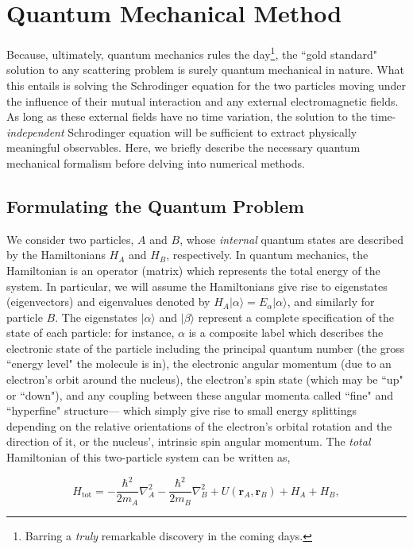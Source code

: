 \documentclass[%
 reprint,
 amsmath,amssymb,
 aps,
 nofootinbib
]{revtex4-1}
\begin{document}
\section{\label{sec:QuantumTraj}Quantum Mechanical Method}
Because, ultimately, quantum mechanics rules the day\footnote{Barring a \textit{truly} remarkable discovery in the coming days.}, the ``gold standard" solution to any scattering problem is surely quantum mechanical in nature. What this entails is solving the Schrodinger equation for the two particles moving under the influence of their mutual interaction and any external electromagnetic fields. As long as these external fields have no time variation, the solution to the time-\textit{independent} Schrodinger equation will be sufficient to extract physically meaningful observables. Here, we briefly describe the necessary quantum mechanical formalism before delving into numerical methods.

\subsection{\label{sec:QuantumFormalism} Formulating the Quantum Problem}
We consider two particles, $A$ and $B$, whose \textit{internal} quantum states are described by the Hamiltonians $H_A$ and $H_B$, respectively. In quantum mechanics, the Hamiltonian is an operator (matrix) which represents the total energy of the system. In particular, we will assume the Hamiltonians give rise to eigenstates (eigenvectors) and eigenvalues denoted by $H_A \lvert \alpha \rangle = E_\alpha \lvert \alpha \rangle$, and similarly for particle $B$. The eigenstates $\lvert \alpha \rangle$ and $\lvert \beta \rangle$ represent a complete specification of the state of each particle: for instance, $\alpha$ is a composite label which describes the electronic state of the particle including the principal quantum number (the gross ``energy level" the molecule is in), the electronic angular momentum (due to an electron's orbit around the nucleus), the electron's spin state (which may be ``up" or ``down"), and any coupling between these angular momenta called ``fine" and ``hyperfine" structure--- which simply give rise to small energy splittings depending on the relative orientations of the electron's orbital rotation and the direction of it, or the nucleus', intrinsic spin angular momentum. The \textit{total} Hamiltonian of this two-particle system can be written as,

\begin{equation}
H_\text{tot} = -\frac{\hbar^2}{2m_A} \nabla_A^2 -\frac{\hbar^2}{2m_B}\nabla_B^2 + U(\mathbf{r}_A,\mathbf{r}_B) + H_A + H_B,
\end{equation}
\end{document}
